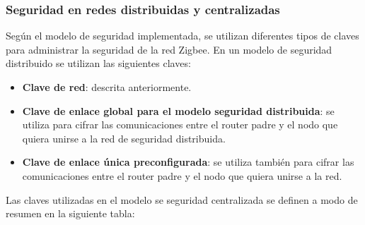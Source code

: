 \subsubsection{Seguridad en redes distribuidas y centralizadas} %
Según el modelo de seguridad implementada, se utilizan diferentes tipos de claves para administrar la seguridad de la red Zigbee. En un modelo de seguridad distribuido se utilizan las siguientes claves:
\begin{itemize}
\item{\bf Clave de red}: descrita anteriormente.
\item{\bf Clave de enlace global para el modelo seguridad distribuida}: se utiliza para cifrar las comunicaciones entre el router padre y el nodo que quiera unirse a la red de seguridad distribuida.
\item{\bf Clave de enlace única preconfigurada}: se utiliza también para cifrar las comunicaciones entre el router padre y el nodo que quiera unirse a la red.
\end{itemize}
Las claves utilizadas en el modelo se seguridad centralizada se definen a modo de resumen en la siguiente tabla:
\clearpage
